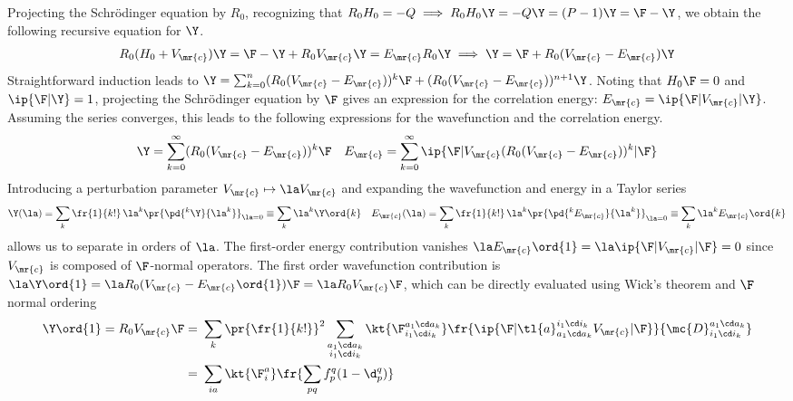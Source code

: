 \documentclass[11pt,fleqn]{article}
\numberwithin{equation}{section}
\begin{document}
\begin{dfn}
Projecting the Schr\"odinger equation by $R_0$, recognizing that
$R_0H_0=-Q\implies R_0H_0\Y=-Q\Y=(P-1)\Y=\F-\Y$,
we obtain the following recursive equation for $\Y$.
\begin{align*}
  R_0
  (H_0 + V_\mr{c})\Y
=
  \F
-
  \Y
+
  R_0V_\mr{c}\Y
=
  E_\mr{c}R_0\Y
\implies
  \Y
=
  \F
+
  R_0
  (V_\mr{c} - E_\mr{c})
  \Y
\end{align*}
Straightforward induction leads to
$
  \Y
=
  \sum_{k=0}^n
  (R_0(V_\mr{c} - E_\mr{c}))^k\F
+
  (R_0(V_\mr{c} - E_\mr{c}))^{n+1}\Y
$.
Noting that $H_0\F=0$ and $\ip{\F|\Y}=1$, projecting the Schr\"odinger equation by $\F$ gives an expression for the correlation energy: $E_\mr{c}=\ip{\F|V_\mr{c}|\Y}$.
Assuming the series converges, this leads to the following expressions for the wavefunction and the correlation energy.
\begin{align}\label{eq:rspt-equations-form-1}
  \Y
=
  \sum_{k=0}^{\infty}
  (R_0(V_\mr{c} - E_\mr{c}))^k\F
&&
  E_\mr{c}
=
  \sum_{k=0}^{\infty}
  \ip{\F|V_\mr{c}(R_0(V_\mr{c} - E_\mr{c}))^k|\F}
\end{align}
Introducing a perturbation parameter $V_\mr{c}\mapsto \la V_\mr{c}$ and expanding the wavefunction and energy in a Taylor series
\begin{align*}
  \Y(\la)
=
  \sum_k
  \fr{1}{k!}\,\la^k\pr{\pd{^k\Y}{\la^k}}_{\la=0}
\equiv
  \sum_k
  \la^k \Y\ord{k}
&&
  E_\mr{c}(\la)
=
  \sum_k
  \fr{1}{k!}\,\la^k\pr{\pd{^kE_\mr{c}}{\la^k}}_{\la=0}
\equiv
  \sum_k
  \la^k
  E_\mr{c}\ord{k}
\end{align*}
allows us to separate  in orders of $\la$.
The first-order energy contribution vanishes
$\la E_\mr{c}\ord{1}=\la\ip{\F|V_\mr{c}|\F}=0$
since $V_\mr{c}$ is composed of $\F$-normal operators.
The first order wavefunction contribution is
$
  \la
  \Y\ord{1}
=
  \la
  R_0
  (V_\mr{c} - E_\mr{c}\ord{1})\F
=
  \la
  R_0
  V_\mr{c}
  \F
$,
which can be directly evaluated using Wick's theorem and $\F$ normal ordering
\begin{align*}
  \Y\ord{1}
=
  R_0
  V_\mr{c}
  \F
=&\
  \sum_k
  \pr{\fr{1}{k!}}^2
  \sum_{\substack{a_1\cd a_k\\i_1\cd i_k}}
  \kt{\F_{i_1\cd i_k}^{a_1\cd a_k}}
  \fr{
    \ip{\F|\tl{a}^{i_1\cd i_k}_{a_1\cd a_k}V_\mr{c}|\F}
  }{
    \mc{D}_{i_1\cd i_k}^{a_1\cd a_k}
  }
\\=&\
  \sum_{ia}
  \kt{\F_i^a}
  \fr{
    \sum_{pq}
    f_p^q(1-\d_p^q)
}
\end{align*}
\end{dfn}
\end{document}

